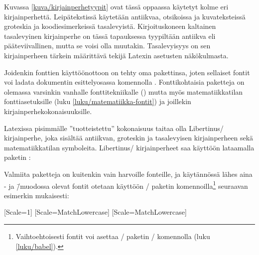 \noindent
Kuvassa \ref{kuva/kirjainperhetyypit} ovat tässä oppaassa käytetyt kolme
eri kirjainperhettä. Leipätekstissä käytetään antiikvaa, otsikoissa ja
kuvateksteissä groteskia ja koodiesimerkeissä tasalevyistä.
Kirjoituskoneen kaltainen tasalevyinen kirjainperhe on tässä tapauksessa
tyypiltään antiikva eli pääteviivallinen, mutta se voisi olla muutakin.
Tasalevyisyys on sen kirjainperheen tärkein määrittävä tekijä Latexin
asetusten näkökulmasta.


Joidenkin fonttien käyttöönottoon on tehty oma pakettinsa, joten
sellaiset fontit voi ladata dokumentin esittelyosassa komennolla
. Fonttikohtaisia paketteja on olemassa
varsinkin vanhalle fonttitekniikalle () mutta myös matematiikkatilan fonttiasetuksille (luku
\ref{luku/matematiikka-fontit}) ja joillekin
kir\-jain\-perhe\-koko\-nai\-suuk\-sille.

Latexissa pisimmälle ''tuotteistettu'' kokonaisuus taitaa olla
Libertinus\-/ kirjainperhe, joka sisältää antiikvan, groteskin ja
tasalevyisen kirjainperheen sekä matematiikkatilan symboleita.
Libertinus\-/ kirjainperheet saa käyttöön lataamalla paketin
:

\begin{koodilohkosis}
\usepackage{libertinus}
\end{koodilohkosis}

\noindent
Valmiita paketteja on kuitenkin vain harvoille fonteille, ja käytännössä
lähes aina - ja  \=/muodossa
olevat fontit otetaan käyttöön \-/ paketin
komennoilla\footnote{Vaihtoehtoisesti fontit voi asettaa
  \-/ paketin \-/ komennolla (luku
  \ref{luku/babel}).} seuraavan esimerkin mukaisesti:

\begin{koodilohkosis}
\setmainfont{TeX Gyre Termes}[Scale=1]
\setsansfont{TeX Gyre Heros} [Scale=MatchLowercase]
\setmonofont{TeX Gyre Cursor}[Scale=MatchLowercase]
\end{koodilohkosis}

